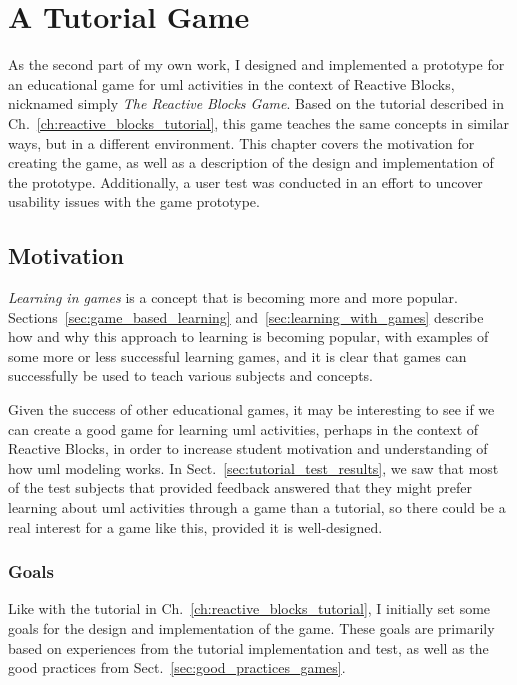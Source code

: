 \chapter{A Tutorial Game}
\label{ch:tutorial_game}
As the second part of my own work, I designed and implemented a prototype for an educational game for \gls{uml} activities in the context of Reactive Blocks, nicknamed simply \emph{The Reactive Blocks Game}. Based on the tutorial described in Ch.~\ref{ch:reactive_blocks_tutorial}, this game teaches the same concepts in similar ways, but in a different environment. This chapter covers the motivation for creating the game, as well as a description of the design and implementation of the prototype. Additionally, a user test was conducted in an effort to uncover usability issues with the game prototype.

\section{Motivation}
\label{sec:game_motivation}
\emph{Learning in games} is a concept that is becoming more and more popular. Sections~\ref{sec:game_based_learning} and~\ref{sec:learning_with_games} describe how and why this approach to learning is becoming popular, with examples of some more or less successful learning games, and it is clear that games can successfully be used to teach various subjects and concepts.

\noindent
Given the success of other educational games, it may be interesting to see if we can create a good game for learning \gls{uml} activities, perhaps in the context of Reactive Blocks, in order to increase student motivation and understanding of how \gls{uml} modeling works. In Sect.~\ref{sec:tutorial_test_results}, we saw that most of the test subjects that provided feedback answered that they might prefer learning about \gls{uml} activities through a game than a tutorial, so there could be a real interest for a game like this, provided it is well-designed.

\subsection{Goals}
\label{sec:game_goals}
Like with the tutorial in Ch.~\ref{ch:reactive_blocks_tutorial}, I initially set some goals for the design and implementation of the game. These goals are primarily based on experiences from the tutorial implementation and test, as well as the good practices from Sect.~\ref{sec:good_practices_games}.

